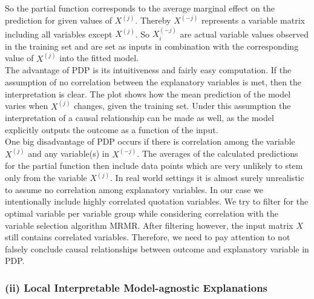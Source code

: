 \documentclass[12pt,titlepage]{article}
\begin{document}
\noindent
So the partial function corresponds to the average marginal effect on the prediction for given values of $X^{(j)}$. Thereby $X^{(-j)}$ represents a variable matrix including all variables except $X^{(j)}$. So $X^{(-j)}_{i}$ are actual variable values observed in the training set and are set as inputs in combination with the corresponding value of $X^{(j)}$ into the fitted model. \\
The advantage of PDP is its intuitiveness and fairly easy computation. If the assumption of no correlation between the explanatory variables is met, then the interpretation is clear. The plot shows how the mean prediction of the model varies when $X^{(j)}$ changes, given the training set. Under this assumption the interpretation of a causal relationship can be made as well, as the model explicitly outputs the outcome as a function of the input. \\
One big disadvantage of PDP occurs if there is correlation among the variable $X^{(j)}$ and any variable(s) in $X^{(-j)}$. The averages of the calculated predictions for the partial function then include data points which are very unlikely to stem only from the variable $X^{(j)}$. In real world settings it is almost surely unrealistic to assume no correlation among explanatory variables. In our case we intentionally include highly correlated quotation variables. We try to filter for the optimal variable per variable group while considering correlation with the variable selection algorithm MRMR. After filtering however, the input matrix $X$ still contains correlated variables. Therefore, we need to pay attention to not falsely conclude causal relationships between outcome and explanatory variable in PDP. \\

\subsubsection*{(ii) Local Interpretable Model-agnostic Explanations}
\end{document}
